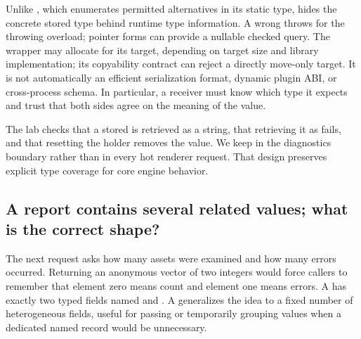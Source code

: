Unlike , which enumerates permitted alternatives in its static type,  hides the concrete stored type behind runtime type information. A wrong  throws  for the throwing overload; pointer forms can provide a nullable checked query. The wrapper may allocate for its target, depending on target size and library implementation; its copyability contract can reject a directly move-only target. It is not automatically an efficient serialization format, dynamic plugin ABI, or cross-process schema. In particular, a receiver must know which type it expects and trust that both sides agree on the meaning of the value.

The lab checks that a stored  is retrieved as a string, that retrieving it as  fails, and that resetting the holder removes the value. We keep  in the diagnostics boundary rather than in every hot renderer request. That design preserves explicit type coverage for core engine behavior.

\subsection{A report contains several related values; what is the correct shape?}\label{01-foundations-i-ch006-a-report-contains-several-related-values-what-is-the-correct-shape}

\hypertarget{01-foundations-i-ch006-a-report-contains-several-related-values-what-is-the-correct-shape}{}

The next request asks how many assets were examined and how many errors occurred. Returning an anonymous vector of two integers would force callers to remember that element zero means count and element one means errors. A  has exactly two typed fields named  and . A  generalizes the idea to a fixed number of heterogeneous fields, useful for passing or temporarily grouping values when a dedicated named record would be unnecessary.

